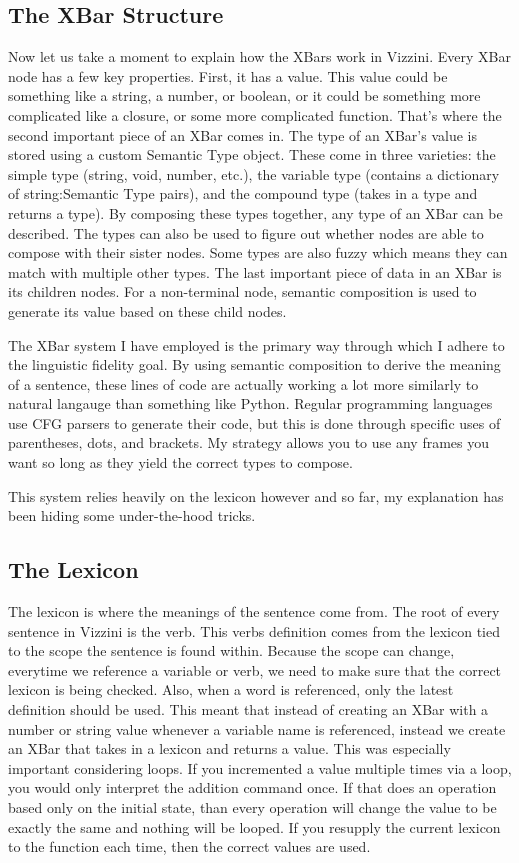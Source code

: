 \documentclass[titlepage]{article}
\newcommand{\langName}{Vizzini}
\begin{document}
\subsection*{The XBar Structure}
Now let us take a moment to explain how the XBars work in \langName{}. Every XBar node has a few key properties. First, it has a value. This value could be something like a string, a number, or boolean, or it could be something more complicated like a closure, or some more complicated function. That's where the second important piece of an XBar comes in. The type of an XBar's value is stored using a custom Semantic Type object. These come in three varieties: the simple type (string, void, number, etc.), the variable type (contains a dictionary of string:Semantic Type pairs), and the compound type (takes in a type and returns a type). By composing these types together, any type of an XBar can be described. The types can also be used to figure out whether nodes are able to compose with their sister nodes. Some types are also fuzzy which means they can match with multiple other types. The last important piece of data in an XBar is its children nodes. For a non-terminal node, semantic composition is used to generate its value based on these child nodes.

The XBar system I have employed is the primary way through which I adhere to the linguistic fidelity goal. By using semantic composition to derive the meaning of a sentence, these lines of code are actually working a lot more similarly to natural langauge than something like Python. Regular programming languages use CFG parsers to generate their code, but this is done through specific uses of parentheses, dots, and brackets. My strategy allows you to use any frames you want so long as they yield the correct types to compose.

This system relies heavily on the lexicon however and so far, my explanation has been hiding some under-the-hood tricks.

\subsection*{The Lexicon}
The lexicon is where the meanings of the sentence come from. The root of every sentence in \langName{} is the verb. This verbs definition comes from the lexicon tied to the scope the sentence is found within. Because the scope can change, everytime we reference a variable or verb, we need to make sure that the correct lexicon is being checked. Also, when a word is referenced, only the latest definition should be used. This meant that instead of creating an XBar with a number or string value whenever a variable name is referenced, instead we create an XBar that takes in a lexicon and returns a value. This was especially important considering loops. If you incremented  a value multiple times via a loop, you would only interpret the addition command once. If that does an operation based only on the initial state, than every operation will change the value to be exactly the same and nothing will be looped. If you resupply the current lexicon to the function each time, then the correct values are used.
\end{document}
